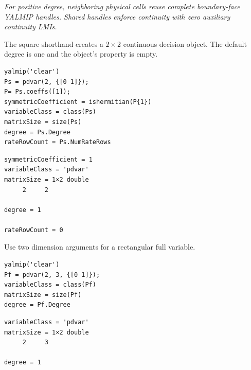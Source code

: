 \begin{center}

\textit{For positive degree, neighboring physical cells reuse complete boundary-face YALMIP handles. Shared handles enforce continuity with zero auxiliary continuity LMIs.}
\end{center}

\examplehead
The square shorthand creates a $2\times2$ continuous decision object. The default degree is one and the object's  property is empty.

\begin{lstlisting}[style=dpmatlab]
yalmip('clear')
Ps = pdvar(2, {[0 1]});
P= Ps.coeffs([1]);
symmetricCoefficient = ishermitian(P{1})
variableClass = class(Ps)
matrixSize = size(Ps)
degree = Ps.Degree
rateRowCount = Ps.NumRateRows
\end{lstlisting}

\begin{lstlisting}[style=dpoutput]
symmetricCoefficient = 1
variableClass = 'pdvar'
matrixSize = 1×2 double
     2     2

degree = 1

rateRowCount = 0
\end{lstlisting}

Use two dimension arguments for a rectangular full variable.

\begin{lstlisting}[style=dpmatlab]
yalmip('clear')
Pf = pdvar(2, 3, {[0 1]});
variableClass = class(Pf)
matrixSize = size(Pf)
degree = Pf.Degree
\end{lstlisting}

\begin{lstlisting}[style=dpoutput]
variableClass = 'pdvar'
matrixSize = 1×2 double
     2     3

degree = 1
\end{lstlisting}


